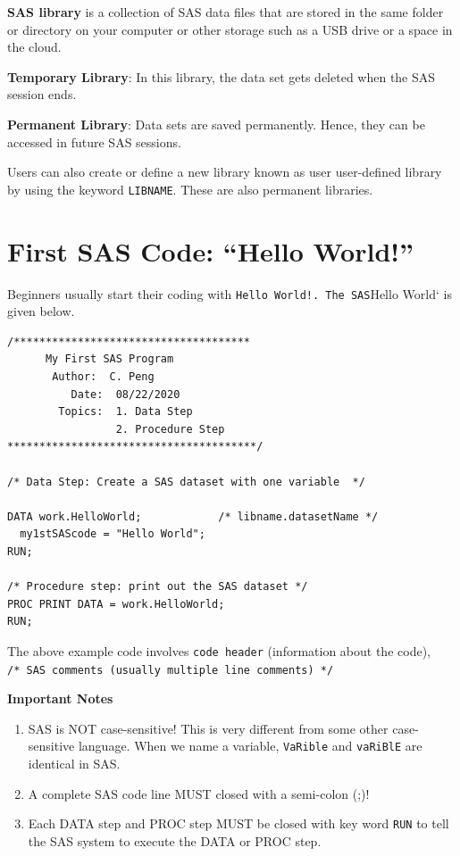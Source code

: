 \documentclass[
]{book}
\begin{document}
\textbf{SAS library} is a collection of SAS data files that are stored in the same folder or directory on your computer or other storage such as a USB drive or a space in the cloud.

\textbf{Temporary Library}: In this library, the data set gets deleted when the SAS session ends.

\textbf{Permanent Library}: Data sets are saved permanently. Hence, they can be accessed in future SAS sessions.

Users can also create or define a new library known as user user-defined library by using the keyword \texttt{LIBNAME}. These are also permanent libraries.

\hypertarget{first-sas-code-hello-world}{%
\section{First SAS Code: ``Hello World!''}\label{first-sas-code-hello-world}}

Beginners usually start their coding with \texttt{Hello\ World!\textquotesingle{}.\ The\ SAS}Hello World` is given below.

\begin{verbatim}
/*************************************  
      My First SAS Program
       Author:  C. Peng
          Date:  08/22/2020
        Topics:  1. Data Step
                 2. Procedure Step
***************************************/

/* Data Step: Create a SAS dataset with one variable  */

DATA work.HelloWorld;            /* libname.datasetName */
  my1stSAScode = "Hello World";
RUN;

/* Procedure step: print out the SAS dataset */
PROC PRINT DATA = work.HelloWorld;
RUN;
\end{verbatim}

The above example code involves \texttt{code\ header} (information about the code), \texttt{/*\ SAS\ comments\ (usually\ multiple\ line\ comments)\ */}

\textbf{Important Notes}

\begin{enumerate}
\def\labelenumi{\arabic{enumi}.}
\item
  SAS is NOT case-sensitive! This is very different from some other case-sensitive language. When we name a variable, \texttt{VaRible} and \texttt{vaRiBlE} are identical in SAS.
\item
  A complete SAS code line MUST closed with a semi-colon (;)!
\item
  Each DATA step and PROC step MUST be closed with key word \texttt{RUN} to tell the SAS system to execute the DATA or PROC step.
\end{enumerate}
\end{document}
